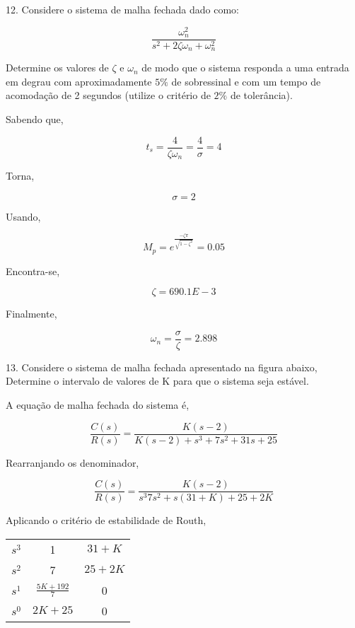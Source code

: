 \documentclass[paper=a4, fontsize=11pt]{article}
\begin{document}
\newpage

12. Considere o sistema de malha fechada dado como:

$$
\frac{\omega_n^2}{s^2 + 2 \zeta \omega_n + \omega_n^2}
$$

Determine os valores de $\zeta$ e $\omega_n$ de modo que o sistema responda a uma entrada em degrau
com aproximadamente $5\%$ de sobressinal e com um tempo de acomodação de 2 segundos
(utilize o critério de $2\%$ de tolerância).

Sabendo que,

$$
t_s = \frac{4}{\zeta \omega_n} = \frac{4}{\sigma} = 4
$$

Torna,

$$
\sigma = 2
$$

Usando,

$$
M_p = e^{\frac{-\zeta \pi}{\sqrt{1-\zeta^2}} } = 0.05
$$

Encontra-se,

$$
\zeta = 690.1E-3
$$

Finalmente,

$$
\omega_n = \frac{\sigma}{\zeta} = 2.898
$$

\newpage

13. Considere o sistema de malha fechada apresentado na figura abaixo,
Determine o intervalo de valores de K para que o sistema seja estável.

A equação de malha fechada do sistema é,

$$
\frac{C(s)}{R(s)} = \frac{K (s-2)}{K (s-2) + s^3 + 7 s^2 + 31 s + 25}
$$

Rearranjando os denominador,

$$
\frac{C(s)}{R(s)} = \frac{K (s-2)}{s^3 7 s^2 + s(31 + K) + 25 + 2K} 
$$

Aplicando o critério de estabilidade de Routh,

\begin{center}
    \begin{tabular}{c| c c}
        $s^3$ & 1 & $31+K$ \\
        $s^2$ & 7 & $25+2K$ \\
        $s^1$ & $\frac{5K+192}{7}$ & 0 \\
        $s^0$ & $2K+25$ & 0 \\
    \end{tabular}
\end{center}
\end{document}
